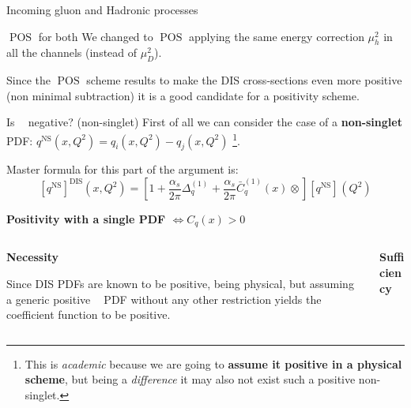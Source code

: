 \documentclass[8pt]{beamer}
\DeclareMathOperator{\msbar}{\overline{MS}}
\DeclareMathOperator{\pos}{POS}
\begin{document}
\begin{frame}{Incoming gluon and Hadronic processes}
    \vspace*{15pt}
    \begin{block}{$\pos$ for both}
    \vspace*{1pt}
        We changed to $\pos$ applying the same energy correction $\mu_h^2$ in all
        the channels (instead of $\mu_D^2$).

        Since the $\pos$ scheme results to make the DIS cross-sections even more
        positive (non minimal subtraction) it is a good candidate for a positivity
        scheme.
    \end{block}
\end{frame}


\begin{frame}{Is $\msbar$ negative? (non-singlet)}
    First of all we can consider the case of a \textbf{non-singlet} PDF:
    $q^{\text{NS}}(x, Q^2) = q_i(x, Q^2) - q_j(x, Q^2)$
    \footnote{This is \textit{academic} because we are going to \textbf{assume
    it positive in a physical scheme}, but being a \textit{difference} it may
    also not exist such a positive non-singlet.}.

    \vspace*{10pt}
    Master formula for this part of the argument is:
    \begin{equation*}
        \left[{q^{\text{NS}}}\right]^{\text{DIS}}(x,Q^2)=
        \left[1+\frac{\alpha_s}{2\pi} {\Delta^{(1)}_q}^{\msbar}
        +\frac{\alpha_s}{2\pi}  {\bar
        C^{(1)}_q(x)}^{\msbar}\otimes\right]\left[{q^{\text{NS}}}\right]^{\msbar}(Q^2)
    \end{equation*}

    \vspace*{20pt}
    \textbf{\large Positivity with a single PDF $\iff C_q(x)^{\msbar} > 0$}
    \vspace*{14pt}

    \begin{columns}
        \begin{column}{0.45\textwidth}
            \textbf{Necessity}
            \newline

            Since DIS PDFs are known to be positive, being physical, but
            assuming a generic positive $\msbar$ PDF without any other
            restriction yields the coefficient function to be
            positive\footnotemark.
        \end{column}
        \begin{column}{0.45\textwidth}
            \textbf{Sufficiency}
            \newline


\end{column}
\end{columns}
\end{frame}
\end{document}
